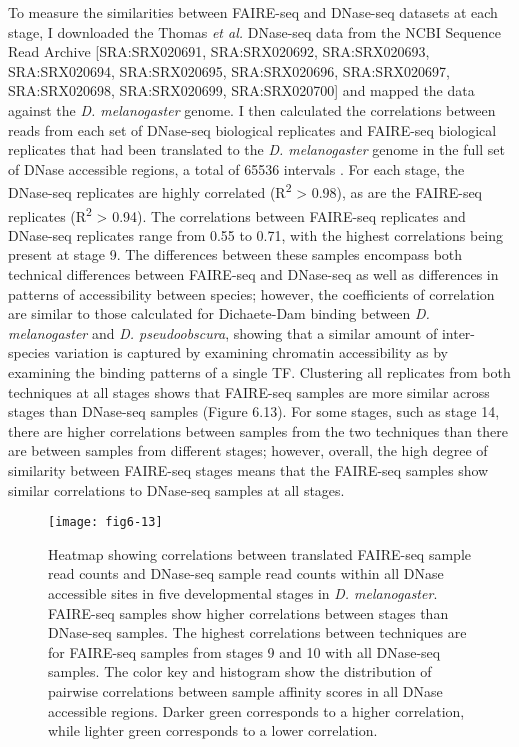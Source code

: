 To measure the similarities between FAIRE-seq and DNase-seq datasets at each stage, I downloaded the Thomas \emph{et al.} DNase-seq data from the NCBI Sequence Read Archive [SRA:SRX020691, SRA:SRX020692, SRA:SRX020693, SRA:SRX020694, SRA:SRX020695, SRA:SRX020696, SRA:SRX020697, SRA:SRX020698, SRA:SRX020699, SRA:SRX020700] and mapped the data against the \emph{D. melanogaster} genome. I then calculated the correlations between reads from each set of DNase-seq biological replicates and FAIRE-seq biological replicates that had been translated to the \emph{D. melanogaster} genome in the full set of DNase accessible regions, a total of 65536 intervals \citep{thomas_dynamic_2011}. For each stage, the DNase-seq replicates are highly correlated (R\textsuperscript{2} > 0.98), as are the FAIRE-seq replicates (R\textsuperscript{2} > 0.94). The correlations between FAIRE-seq replicates and DNase-seq replicates range from 0.55 to 0.71, with the highest correlations being present at stage 9. The differences between these samples encompass both technical differences between FAIRE-seq and DNase-seq as well as differences in patterns of accessibility between species; however, the coefficients of correlation are similar to those calculated for Dichaete-Dam binding between \emph{D. melanogaster} and \emph{D. pseudoobscura}, showing that a similar amount of inter-species variation is captured by examining chromatin accessibility as by examining the binding patterns of a single TF. Clustering all replicates from both techniques at all stages shows that FAIRE-seq samples are more similar across stages than DNase-seq samples (Figure 6.13). For some stages, such as stage 14, there are higher correlations between samples from the two techniques than there are between samples from different stages; however, overall, the high degree of similarity between FAIRE-seq stages means that the FAIRE-seq samples show similar correlations to DNase-seq samples at all stages.\\

\begin{figure}
\centering
\texttt{[image: fig6-13]}
\caption{Heatmap showing correlations between translated FAIRE-seq sample read counts and DNase-seq sample read counts within all DNase accessible sites in five developmental stages in \emph{D. melanogaster}. FAIRE-seq samples show higher correlations between stages than DNase-seq samples. The highest correlations between techniques are for FAIRE-seq samples from stages 9 and 10 with all DNase-seq samples. The color key and histogram show the distribution of pairwise correlations between sample affinity scores in all DNase accessible regions. Darker green corresponds to a higher correlation, while lighter green corresponds to a lower correlation.}
\label{Figure 6.13}
\end{figure}

